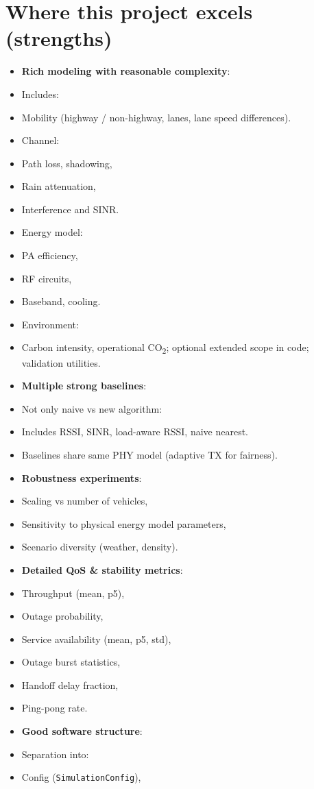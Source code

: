 \documentclass[conference]{IEEEtran}
\begin{document}
\section{Where this project excels (strengths)}
\begin{itemize}
\item \textbf{Rich modeling with reasonable complexity}:
\item Includes:
\item Mobility (highway / non-highway, lanes, lane speed differences).
\item Channel:
\item Path loss, shadowing,
\item Rain attenuation,
\item Interference and SINR.
\item Energy model:
\item PA efficiency,
\item RF circuits,
\item Baseband, cooling.
\item Environment:
\item Carbon intensity, operational CO\textsubscript{2}; optional extended scope in code; validation utilities.
\item \textbf{Multiple strong baselines}:
\item Not only naive vs new algorithm:
\item Includes RSSI, SINR, load-aware RSSI, naive nearest.
\item Baselines share same PHY model (adaptive TX for fairness).
\item \textbf{Robustness experiments}:
\item Scaling vs number of vehicles,
\item Sensitivity to physical energy model parameters,
\item Scenario diversity (weather, density).
\item \textbf{Detailed QoS \& stability metrics}:
\item Throughput (mean, p5),
\item Outage probability,
\item Service availability (mean, p5, std),
\item Outage burst statistics,
\item Handoff delay fraction,
\item Ping-pong rate.
\item \textbf{Good software structure}:
\item Separation into:
\item Config (\texttt{SimulationConfig}),

\end{itemize}
\end{document}
